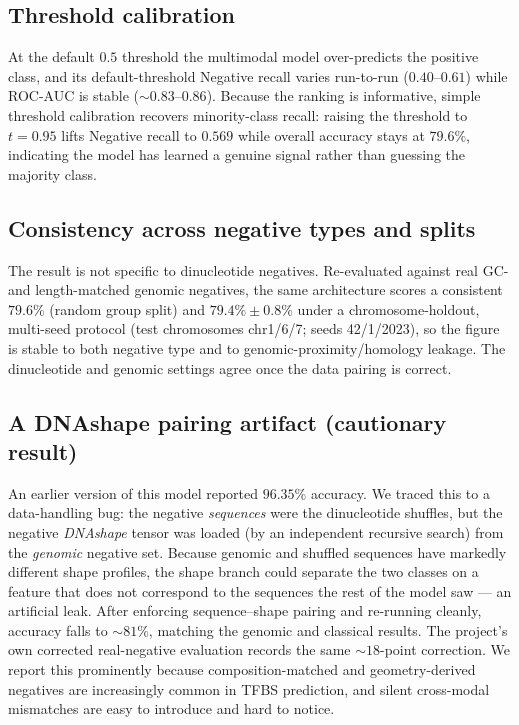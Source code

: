 \documentclass[11pt]{article}
\begin{document}
\subsection{Threshold calibration}
At the default $0.5$ threshold the multimodal model over-predicts the positive class,
and its default-threshold Negative recall varies run-to-run ($0.40$--$0.61$) while
ROC-AUC is stable ($\sim\!0.83$--$0.86$). Because the ranking is informative, simple
threshold calibration recovers minority-class recall: raising the threshold to
$t=0.95$ lifts Negative recall to $0.569$ while overall accuracy stays at $79.6\%$,
indicating the model has learned a genuine signal rather than guessing the majority
class.

\subsection{Consistency across negative types and splits}
The result is not specific to dinucleotide negatives. Re-evaluated against real
GC- and length-matched genomic negatives, the same architecture scores a consistent
$79.6\%$ (random group split) and $79.4\% \pm 0.8\%$ under a chromosome-holdout,
multi-seed protocol (test chromosomes chr1/6/7; seeds 42/1/2023), so the figure is
stable to both negative type and to genomic-proximity/homology leakage. The
dinucleotide and genomic settings agree once the data pairing is correct.

\subsection{A DNAshape pairing artifact (cautionary result)}
\label{sec:artifact}
An earlier version of this model reported $96.35\%$ accuracy. We traced this to a
data-handling bug: the negative \emph{sequences} were the dinucleotide shuffles, but
the negative \emph{DNAshape} tensor was loaded (by an independent recursive search)
from the \emph{genomic} negative set. Because genomic and shuffled sequences have
markedly different shape profiles, the shape branch could separate the two classes
on a feature that does not correspond to the sequences the rest of the model saw ---
an artificial leak. After enforcing sequence--shape pairing and re-running cleanly,
accuracy falls to $\sim\!81\%$, matching the genomic and classical results. The
project's own corrected real-negative evaluation records the same $\sim\!18$-point
correction. We report this prominently because composition-matched and
geometry-derived negatives are increasingly common in TFBS prediction, and silent
cross-modal mismatches are easy to introduce and hard to notice.
\end{document}
